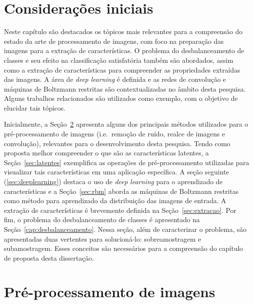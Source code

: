 \section{Considerações iniciais}

Neste capítulo são destacados os tópicos mais relevantes para a compreensão do estado da arte de processamento de imagens, com foco na preparação das imagens para a extração de características. O problema do desbalanceamento de classes e seu efeito na classificação satisfatória também são abordados, assim como a extração de características para compreender as propriedades extraídas das imagens. A área de \textit{deep learning} é definida e as redes de convolução e máquinas de Boltzmann restritas são contextualizadas no âmbito desta pesquisa. Alguns trabalhos relacionados são utilizados como exemplo, com o objetivo de elucidar tais tópicos.

Inicialmente, a Seção~\ref{sec:preprocessamento} apresenta alguns dos principais métodos utilizados para o pré-processamento de imagens (i.e.\ remoção de ruído, realce de imagens e convolução), relevantes para o desenvolvimento desta pesquisa. Tendo como proposta melhor compreender o que são as características latentes, a Seção~\ref{sec:latentes} exemplifica as operações de pré-processamento utilizadas para visualizar tais características em uma aplicação específica. A seção seguinte (\ref{sec:deeplearning}) destaca o uso de \textit{deep learning} para o aprendizado de características e a Seção~\ref{sec:rbm} aborda as máquinas de Boltzmann restritas como método para aprendizado da distribuição das imagens de entrada. A extração de características é brevemente definida na Seção~\ref{sec:extracao}. Por fim, o problema do desbalanceamento de classes é apresentado na Seção~\ref{cap:desbalanceamento}. Nessa seção, além de caracterizar o problema, são apresentadas duas vertentes para solucioná-lo: sobreamostragem e subamostragem. Esses conceitos são necessários para a compreensão do capítulo de proposta desta dissertação.

\section{Pré-processamento de imagens}
\label{sec:preprocessamento}

